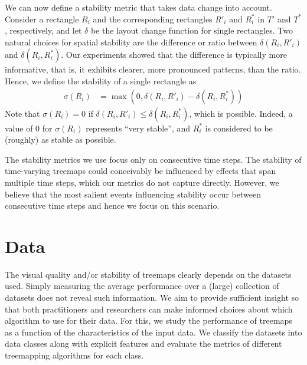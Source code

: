 We can now define a stability metric that takes data change into account. Consider a rectangle $R_i$ and the corresponding rectangles $R'_i$ and $R^*_i$ in $T'$ and $T^*$, respectively, and let $\delta$ be the layout change function for single rectangles. Two natural choices for spatial stability are the difference or ratio between $\delta(R_i, R'_i)$ and $\delta(R_i, R^*_i)$. Our experiments showed that the difference is typically more informative, that is, it exhibits clearer, more pronounced patterns, than the ratio. Hence, we define the stability of a single rectangle 
as
%
\begin{align}
\sigma(R_i) &= \max(0, \delta(R_i, R'_i) - \delta(R_i, R^*_i)) \label{eqn:sigma_ct}
\end{align}
%
Note that $\sigma(R_i) = 0$ if $\delta(R_i, R'_i) \leq \delta(R_i, R_i^*)$, which is possible. Indeed, a value of $0$ for $\sigma(R_i)$ represents ``very stable'', and $R_i^*$ is considered to be (roughly) as stable as possible.

 The stability metrics we use focus only on consecutive time steps. The stability of time-varying treemaps could conceivably be influenced by effects that span multiple time steps, which our metrics do not capture directly. However, we believe that the most salient events influencing stability occur between consecutive time steps and hence we focus on this scenario.


\section{Data}
\label{sec:data}
%
The visual quality and/or stability of treemaps clearly depends on the datasets used. Simply measuring the average performance over a (large) collection of datasets does not reveal such information. We aim to provide sufficient insight so that both practitioners and researchers can make informed choices about which algorithm to use for their data. For this, we study the performance of treemaps as a function of the characteristics of the input data. We classify the datasets into data classes along with explicit features and evaluate the metrics of different treemapping algorithms for each class. 


